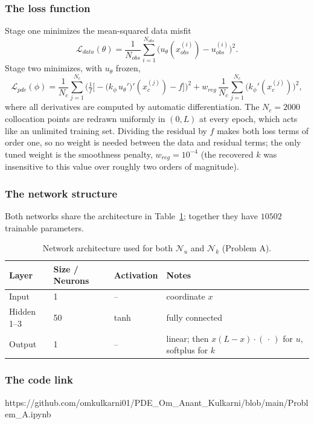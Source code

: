 \subsubsection{The loss function}
Stage one minimizes the mean-squared data misfit
\begin{equation}
    \mathcal{L}_{data}(\theta)
    = \frac{1}{N_{obs}}\sum_{i=1}^{N_{obs}}
      \big(u_\theta(x_{obs}^{(i)}) - u_{obs}^{(i)}\big)^2 .
\end{equation}
Stage two minimizes, with $u_\theta$ frozen,
\begin{equation}
    \mathcal{L}_{pde}(\phi)
    = \frac{1}{N_c}\sum_{j=1}^{N_c}
      \Big(\tfrac{1}{f}\big[-\big(k_\phi\,u_\theta'\big)'(x_c^{(j)}) - f\big]\Big)^2
      + w_{reg}\,\frac{1}{N_c}\sum_{j=1}^{N_c}\big(k_\phi'(x_c^{(j)})\big)^2 ,
\end{equation}
where all derivatives are computed by automatic differentiation. The
$N_c = 2000$ collocation points are redrawn uniformly in $(0,L)$ at every
epoch, which acts like an unlimited training set. Dividing the residual by
$f$ makes both loss terms of order one, so no weight is needed between the
data and residual terms; the only tuned weight is the smoothness penalty,
$w_{reg} = 10^{-4}$ (the recovered $k$ was insensitive to this value over
roughly two orders of magnitude).
%
\subsubsection{The network structure}
Both networks share the architecture in Table~\ref{tab:problem_A_net};
together they have $10502$ trainable parameters.
%
\begin{table}[htbp]
\centering
\caption{Network architecture used for both $\mathcal{N}_u$ and $\mathcal{N}_k$ (Problem A).}
\label{tab:problem_A_net}
\begin{tabular}{llll}
\hline
\textbf{Layer} & \textbf{Size / Neurons} & \textbf{Activation} & \textbf{Notes} \\
\hline
Input          & 1   & --    & coordinate $x$ \\
Hidden 1--3    & 50  & tanh  & fully connected \\
Output         & 1   & --    & linear; then $x(L-x)\cdot(\,\cdot\,)$ for $u$, softplus for $k$ \\
\hline
\end{tabular}
\end{table}
%
\subsubsection{The code link}
{https://github.com/omkulkarni01/PDE_Om_Anant_Kulkarni/blob/main/Problem_A.ipynb}
%
